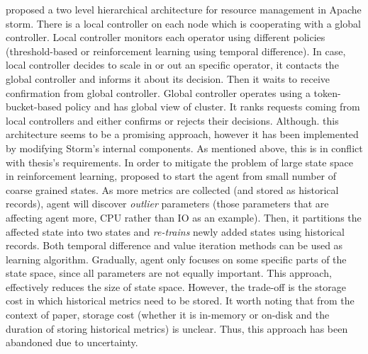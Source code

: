 \textcite{CARDELLINI2018171} proposed a two level hierarchical architecture for resource management in Apache storm\cite{Storm}. There is a local controller on each node which is cooperating with a global controller. Local controller monitors each operator using different policies (threshold-based or reinforcement learning using temporal difference). In case, local controller decides to scale in or out an specific operator, it contacts the global controller and informs it about its decision. Then it waits to receive confirmation from global controller. Global controller operates using a token-bucket-based policy\cite{Valeria:2018} and has global view of cluster. It ranks requests coming from local controllers and either confirms or rejects their decisions. Although. this architecture seems to be a promising approach, however it has been implemented by modifying Storm's internal components. As mentioned above, this is in conflict with thesis's requirements.
\newpage
In order to mitigate the problem of large state space in reinforcement learning, \textcite{Lolos:2017} proposed to start the agent from small number of coarse grained states. As more metrics are collected (and stored as historical records), agent will discover \emph{outlier} parameters (those parameters that are affecting agent more, CPU rather than IO as an example). Then, it partitions the affected state into two states and \emph{re-trains} newly added states using historical records. Both temporal difference and value iteration methods can be used as learning algorithm. Gradually, agent only focuses on some specific parts of the state space, since all parameters are not equally important. This approach, effectively reduces the size of state space. However, the trade-off is the storage cost in which historical metrics need to be stored. It worth noting that from the context of paper, storage cost (whether it is in-memory or on-disk and the duration of storing historical metrics) is unclear. Thus, this approach has been abandoned due to uncertainty.